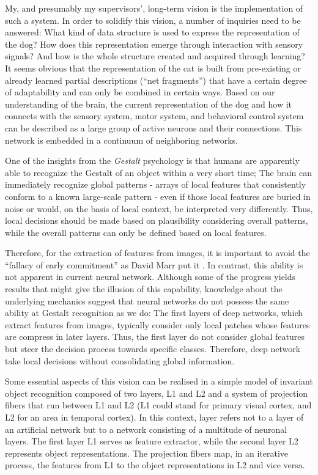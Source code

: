 My, and presumably my supervisors', long-term vision is the implementation of such a system. In order to solidify this vision, a number of inquiries need to be answered: What kind of data structure is used to express the representation of the dog? How does this representation emerge through interaction with sensory signals? And how is the whole structure created and acquired through learning? It seems obvious that the representation of the cat is built from pre-existing or already learned partial descriptions (``net fragments'') that have a certain degree of adaptability and can only be combined in certain ways.
Based on our understanding of the brain, the current representation of the dog and how it connects with the sensory system, motor system, and behavioral control system can be described as a large group of active neurons and their connections. This network is embedded in a continuum of neighboring networks.

One of the insights from the \emph{Gestalt} psychology is that humans are apparently able to recognize the Gestalt of an object within a very short time; The brain can immediately recognize global patterns - arrays of local features that consistently conform to a known large-scale pattern - even if those local features are buried in noise or would, on the basis of local context, be interpreted very differently. Thus, local decisions should be made based on plausibility considering overall patterns, while the overall patterns can only be defined based on local features.

Therefore, for the extraction of features from images, it is important to avoid the ``fallacy of early commitment'' as David Marr put it . In contrast, this ability is not apparent in current neural network. Although some of the progress yields results that might give the illusion of this capability, knowledge about the underlying mechanics suggest that neural networks do not possess the same ability at Gestalt recognition as we do: The first layers of deep networks, which extract features from images, typically consider only local patches whose features are compress in later layers. Thus, the first layer do not consider global features but steer the decision process towards specific classes. Therefore, deep network take local decisions without consolidating global information.

Some essential aspects of this vision can be realised in a simple model of invariant object recognition composed of two layers, L1 and L2 and a system of projection fibers that run between L1 and L2 (L1 could stand for primary visual cortex, and L2 for an area in temporal cortex).
In this context, layer refers not to a layer of an artificial network but to a network consisting of a multitude of neuronal layers.
The first layer L1 serves as feature extractor, while the second layer L2 represents object representations. The projection fibers map, in an iterative process, the features from L1 to the object representations in L2 and vice versa.


